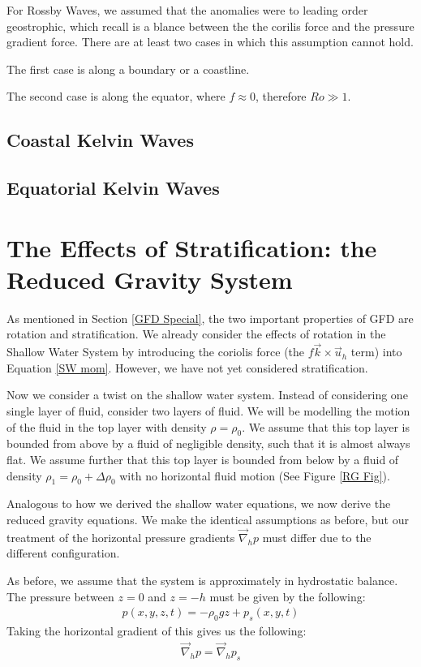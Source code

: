 For Rossby Waves, we assumed that the anomalies were to leading order geostrophic, which recall is a blance between the the corilis force and the pressure gradient force. There are at least two cases in which this assumption cannot hold.

The first case is along a boundary or a coastline.

The second case is along the equator, where $f\approx 0$, therefore $Ro \gg 1$. 

\subsection{Coastal Kelvin Waves}

\subsection{Equatorial Kelvin Waves}

\section{The Effects of Stratification: the Reduced Gravity System}

As mentioned in Section \ref{GFD Special}, the two important properties of GFD are rotation and stratification. We already consider the effects of rotation in the Shallow Water System by introducing the coriolis force (the $f\vec{k}\times\vec{u}_h$ term) into Equation \ref{SW mom}. However, we have not yet considered stratification.

Now we consider a twist on the shallow water system. Instead of considering one single layer of fluid, consider two layers of fluid. We will be modelling the motion of the fluid in the top layer with density $\rho=\rho_0$. We assume that this top layer is bounded from above by a fluid of negligible density, such that it is almost always flat. We assume further that this top layer is bounded from below by a fluid of density $\rho_1=\rho_0+\Delta \rho_0$ with no horizontal fluid motion (See Figure \ref{RG Fig}).

Analogous to how we derived the shallow water equations, we now derive the reduced gravity equations. We make the identical assumptions as before, but our treatment of the horizontal pressure gradients $\vec{\nabla}_h p$ must differ due to the different configuration.

As before, we assume that the system is approximately in hydrostatic balance. The pressure between $z=0$ and $z=-h$ must be given by the following:
\begin{align*}
    p(x,y,z,t)= -\rho_0 g z + p_s(x,y,t)
\end{align*}
Taking the horizontal gradient of this gives us the following:
\begin{align*}
    \vec{\nabla}_h p = \vec{\nabla}_h p_s
\end{align*}

